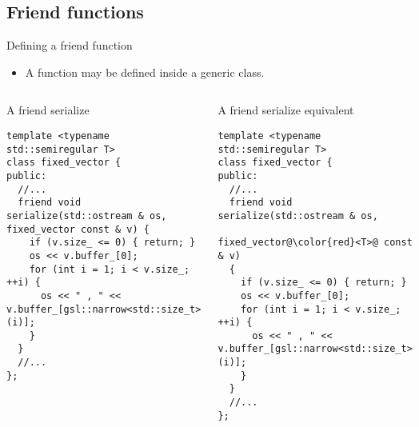 \subsection{Friend functions}

\begin{frame}[t,fragile,shrink=18]{Defining a friend function}
\begin{itemize}
  \item A  function may be defined inside a generic class.
\end{itemize}

\begin{columns}[T]


\begin{block}{A friend serialize}
\begin{lstlisting}
template <typename std::semiregular T>
class fixed_vector {
public:
  //...
  friend void serialize(std::ostream & os, fixed_vector const & v) {
    if (v.size_ <= 0) { return; }
    os << v.buffer_[0];
    for (int i = 1; i < v.size_; ++i) {
      os << " , " << v.buffer_[gsl::narrow<std::size_t>(i)];
    }
  }
  //...  
};
\end{lstlisting}
\end{block}

\pause
{}
\begin{block}{A friend serialize equivalent}
\begin{lstlisting}[escapechar=@]
template <typename std::semiregular T>
class fixed_vector {
public:
  //...
  friend void serialize(std::ostream & os, 
                        fixed_vector@\color{red}<T>@ const & v) 
  {
    if (v.size_ <= 0) { return; }
    os << v.buffer_[0];
    for (int i = 1; i < v.size_; ++i) {
      os << " , " << v.buffer_[gsl::narrow<std::size_t>(i)];
    }
  }
  //...  
};
\end{lstlisting}
\end{block}

\end{columns}

\end{frame}


